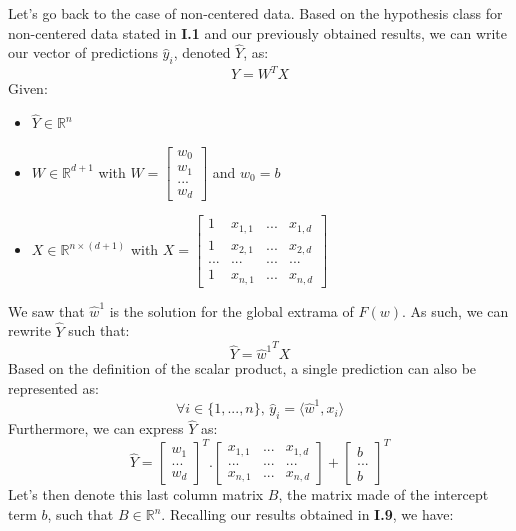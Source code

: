\documentclass{homework}
\begin{document}
Let's go back to the case of non-centered data. Based on the hypothesis class for non-centered data stated in \textbf{I.1} 
and our previously obtained results, we can write our vector of predictions $\hat{y}_i$, denoted $\hat{Y}$, as:
$$\hat{Y}=W^TX$$
Given:
\begin{itemize}
    \item $\hat{Y}\in\mathbb{R}^n$
    \item $W\in\mathbb{R}^{d+1}$ with $W=
            \begin{bmatrix}
             w_0\\
             w_1\\
            ...  \\
            w_d
            \end{bmatrix}$ and $w_0=b$
    \item $X\in\mathbb{R}^{n\times(d+1)}$ with $X=
            \begin{bmatrix}
             1 & x_{1,1} & ... & x_{1,d} \\
             1 & x_{2,1} & ... & x_{2,d} \\
            ... & ... & ... & ...  \\
            1 & x_{n,1} & ... & x_{n,d} 
            \end{bmatrix}$
\end{itemize}
We saw that $\hat{w}^1$ is the solution for the global extrama of $F(w)$. As such, we can rewrite $\hat{Y}$
such that:
$$\hat{Y}={\hat{w}^1}^TX$$
Based on the definition of the scalar product, a single prediction can also be represented as:
$$\forall i\in \{1, ..., n\},\, \hat{y}_i=\langle\hat{w}^1, x_i\rangle$$
Furthermore, we can express $\hat{Y}$ as:
$$\hat{Y}=
\begin{bmatrix}
w_1\\
...\\
w_d
\end{bmatrix}^T.\begin{bmatrix}
x_{1,1} & ... & x_{1, d}\\
... & ... & ... \\
x_{n,1} & ... & x_{n, d}
\end{bmatrix}+\begin{bmatrix}
b\\
...\\
b
\end{bmatrix}^T$$
Let's then denote this last column matrix $B$, the matrix made of the intercept term $b$, such that $B\in\mathbb{R}^n$. Recalling our
results obtained in \textbf{I.9}, we have:
\end{document}
